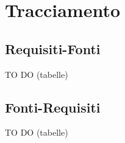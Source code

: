 %


\section{Tracciamento} %
\label{sec:tracciamento}
	\subsection{Requisiti-Fonti} %
	\label{ssub:requisiti_fonti}
	TO DO (tabelle)
	
	\subsection{Fonti-Requisiti} %
	\label{sub:fonti_requisiti}
	TO DO (tabelle)
	





